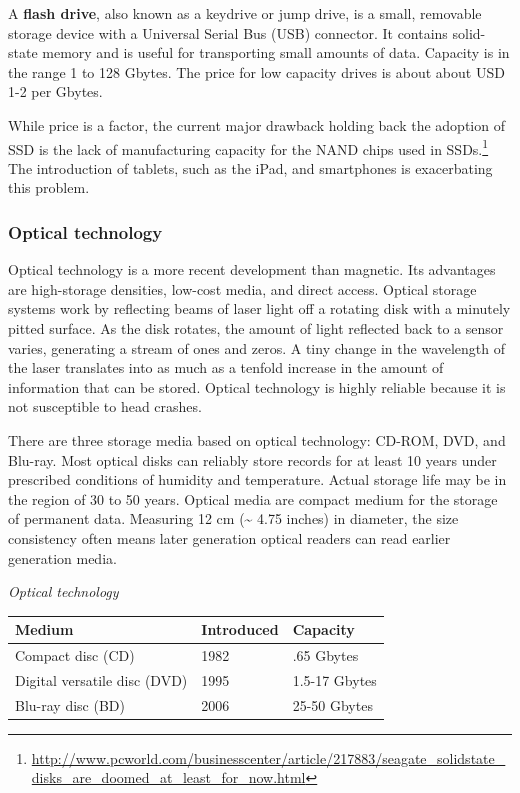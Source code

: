 \documentclass[
]{article}
\begin{document}
A \textbf{flash drive}, also known as a keydrive or jump drive, is a small,
removable storage device with a Universal Serial Bus (USB) connector. It
contains solid-state memory and is useful for transporting small amounts
of data. Capacity is in the range 1 to 128 Gbytes. The price for low
capacity drives is about about USD 1-2 per Gbytes.

While price is a factor, the current major drawback holding back the
adoption of SSD is the lack of manufacturing capacity for the NAND chips
used in SSDs.\footnote{\url{http://www.pcworld.com/businesscenter/article/217883/seagate_solidstate_disks_are_doomed_at_least_for_now.html}} The introduction of tablets, such as the iPad, and
smartphones is exacerbating this problem.

\hypertarget{optical-technology}{%
\subsubsection*{Optical technology}\label{optical-technology}}

Optical technology is a more recent development than magnetic. Its
advantages are high-storage densities, low-cost media, and direct
access. Optical storage systems work by reflecting beams of laser light
off a rotating disk with a minutely pitted surface. As the disk rotates,
the amount of light reflected back to a sensor varies, generating a
stream of ones and zeros. A tiny change in the wavelength of the laser
translates into as much as a tenfold increase in the amount of
information that can be stored. Optical technology is highly reliable
because it is not susceptible to head crashes.

There are three storage media based on optical technology: CD-ROM, DVD,
and Blu-ray. Most optical disks can reliably store records for at least
10 years under prescribed conditions of humidity and temperature. Actual
storage life may be in the region of 30 to 50 years. Optical media are
compact medium for the storage of permanent data. Measuring 12 cm (\textasciitilde{}
4.75 inches) in diameter, the size consistency often means later
generation optical readers can read earlier generation media.

\emph{Optical technology}

\begin{longtable}[]{@{}lll@{}}
\toprule
Medium & Introduced & Capacity \\
\midrule
\endhead
Compact disc (CD) & 1982 & .65 Gbytes \\
Digital versatile disc (DVD) & 1995 & 1.5-17 Gbytes \\
Blu-ray disc (BD) & 2006 & 25-50 Gbytes \\
\bottomrule
\end{longtable}
\end{document}

